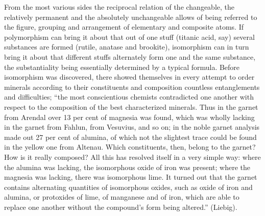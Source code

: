 \documentclass[12pt,a4paper]{book}
\begin{document}
From the most various sides the reciprocal relation of the changeable, the
relatively permanent and the absolutely
unchangeable allows of being referred to the figure, grouping and arrangement
of elementary and composite atoms. If polymorphism can bring it about that out
of one stuff (titanic acid, say) several substances are formed (rutile, anatase
and brookite), isomorphism can in turn bring it about that different stuffs
alternately form one and the same substance, the substantiality being
essentially determined by a typical formula. Before isomorphism was discovered,
there showed themselves in every attempt to order minerals according to their
constituents and composition countless entanglements and difficulties; ``the
most conscientious chemists contradicted one another with respect to the
composition of the best characterized minerals. Thus in the garnet from Arendal
over 13 per cent of magnesia was found, which was wholly lacking in the garnet
from Fahlun, from Vesuvius, and so on; in the noble garnet analysis made out 27
per cent of alumina, of which not the slightest trace could be found in the
yellow one from Altenau. Which constituents, then, belong to the garnet? How is
it really composed? All this has resolved itself in a very simple way: where
the alumina was lacking, the isomorphous oxide of iron was present; where the
magnesia was lacking, there was isomorphous lime. It turned out that the garnet
contains alternating quantities of isomorphous oxides, such as oxide of iron
and alumina, or protoxides of lime, of manganese and of iron, which are able to
replace one another without the compound's form being altered.'' (Liebig).
\end{document}
